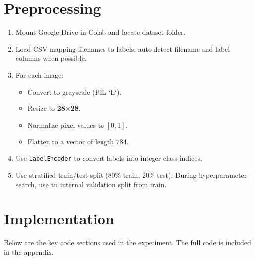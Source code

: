 \documentclass[11pt,a4paper]{article}
\begin{document}
\section{Preprocessing}
\begin{enumerate}
  \item Mount Google Drive in Colab and locate dataset folder.
  \item Load CSV mapping filenames to labels; auto-detect filename and label columns when possible.
  \item For each image:
    \begin{itemize}
      \item Convert to grayscale (PIL `L`).
      \item Resize to \textbf{28$\times$28}.
      \item Normalize pixel values to $[0,1]$.
      \item Flatten to a vector of length $784$.
    \end{itemize}
  \item Use \texttt{LabelEncoder} to convert labels into integer class indices.
  \item Use stratified train/test split (80\% train, 20\% test). During hyperparameter search, use an internal validation split from train.
\end{enumerate}

\section{Implementation}
Below are the key code sections used in the experiment. The full code is included in the appendix.
\end{document}
